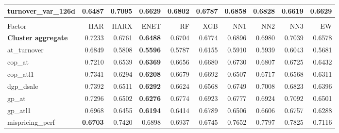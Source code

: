 \begin{longtable}{>{\raggedright\arraybackslash}p{2.6cm}rrrrrrrrr}
turnover\_var\_126d & \textbf{0.6487} & 0.7095 & 0.6629 & 0.6802 & 0.6787 & 0.6858 & 0.6828 & 0.6619 & 0.6629 \\
\hline
\multicolumn{10}{@{}l}{\textit{Panel I. Quality}} \\
\hline
Factor & HAR & HARX & ENET & RF & XGB & NN1 & NN2 & NN3 & EW \\
\hline
\textbf{Cluster aggregate} & 0.7233 & \cellcolor{blue!10}0.6761 & \textbf{\cellcolor{blue!10}0.6488} & \cellcolor{blue!10}0.6704 & \cellcolor{blue!10}0.6774 & \cellcolor{blue!10}0.6896 & \cellcolor{blue!10}0.6980 & \cellcolor{blue!10}0.7039 & \cellcolor{blue!10}0.6578 \\
at\_turnover & 0.6849 & \cellcolor{blue!10}0.5808 & \textbf{\cellcolor{blue!10}0.5596} & \cellcolor{blue!10}0.5787 & \cellcolor{blue!10}0.6155 & \cellcolor{blue!10}0.5910 & \cellcolor{blue!10}0.5939 & \cellcolor{blue!10}0.6043 & \cellcolor{blue!10}0.5681 \\
cop\_at & 0.7210 & \cellcolor{blue!10}0.6539 & \textbf{\cellcolor{blue!10}0.6369} & \cellcolor{blue!10}0.6656 & \cellcolor{blue!10}0.6680 & \cellcolor{blue!10}0.6730 & \cellcolor{blue!10}0.6807 & \cellcolor{blue!10}0.6725 & \cellcolor{blue!10}0.6432 \\
cop\_atl1 & 0.7341 & \cellcolor{blue!10}0.6294 & \textbf{\cellcolor{blue!10}0.6208} & \cellcolor{blue!10}0.6679 & \cellcolor{blue!10}0.6692 & \cellcolor{blue!10}0.6507 & \cellcolor{blue!10}0.6717 & \cellcolor{blue!10}0.6568 & \cellcolor{blue!10}0.6311 \\
dgp\_dsale & 0.7392 & \cellcolor{blue!10}0.6511 & \textbf{\cellcolor{blue!10}0.6292} & \cellcolor{blue!10}0.6624 & \cellcolor{blue!10}0.6568 & \cellcolor{blue!10}0.6749 & \cellcolor{blue!10}0.7008 & \cellcolor{blue!10}0.6823 & \cellcolor{blue!10}0.6396 \\
gp\_at & 0.7296 & \cellcolor{blue!10}0.6502 & \textbf{\cellcolor{blue!10}0.6276} & \cellcolor{blue!10}0.6774 & \cellcolor{blue!10}0.6923 & \cellcolor{blue!10}0.6777 & \cellcolor{blue!10}0.6924 & \cellcolor{blue!10}0.7092 & \cellcolor{blue!10}0.6501 \\
gp\_atl1 & 0.6968 & \cellcolor{blue!10}0.6455 & \textbf{\cellcolor{blue!10}0.6194} & \cellcolor{blue!10}0.6414 & \cellcolor{blue!10}0.6789 & \cellcolor{blue!10}0.6506 & \cellcolor{blue!10}0.6606 & \cellcolor{blue!10}0.6757 & \cellcolor{blue!10}0.6288 \\
mispricing\_perf & \textbf{0.6703} & 0.7420 & 0.6898 & 0.6937 & 0.6745 & 0.7652 & 0.7797 & 0.7825 & 0.7116 \\

\end{longtable}
